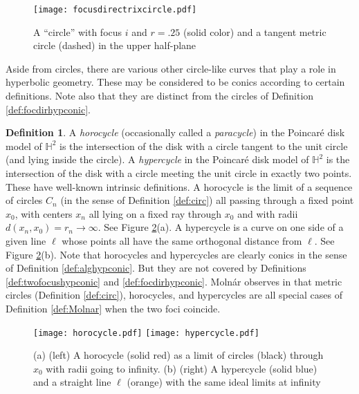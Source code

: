 \documentclass[12pt]{amsart}
\theoremstyle{definition}
\newtheorem{definition}[theorem]{Definition}
\begin{document}
\begin{figure}[hbt]
  \begin{center}
    \texttt{[image: focusdirectrixcircle.pdf]}
    \end{center}
\caption{A ``circle''  with focus $i$ and $r=.25$ (solid color) and a
  tangent metric circle (dashed) in the upper half-plane}
\label{fig:circ}
\end{figure}  

Aside from circles, there are various other circle-like curves that
play a role in hyperbolic geometry.  These may be considered to be
conics according to certain definitions. Note also that they are
distinct from the circles of Definition \ref{def:focdirhypconic}.
\begin{definition}
\label{def:cycle}
A \emph{horocycle} (occasionally called a \emph{paracycle})
in the Poincar\'e disk model of ${\mathbb H}^2$ is the
intersection of the disk with a circle tangent to the unit circle (and
lying inside the circle). A \emph{hypercycle} in the Poincar\'e disk
model of ${\mathbb H}^2$ is the intersection of the disk with a circle meeting
the unit circle in exactly two points.  These have well-known
intrinsic definitions. A horocycle is the limit of a sequence
of circles $C_n$ (in the sense of Definition \ref{def:circ}) all
passing through a fixed point $x_0$, with
centers $x_n$ all lying on a fixed ray through $x_0$
and with radii $d(x_n,x_0)=r_n\to \infty$.  See Figure \ref{fig:horo}(a).
A hypercycle is a curve on one side of a given line $\ell$
whose points all have the same orthogonal distance from $\ell$.
See Figure \ref{fig:horo}(b).
Note that horocycles and hypercycles are clearly conics
in the sense of Definition \ref{def:alghypconic}. But they are not
covered by Definitions \ref{def:twofocushypconic} and
\ref{def:focdirhypconic}. Moln\'ar observes in \cite{MR487028} that
metric circles (Definition \ref{def:circ}), horocycles, and
hypercycles are all special cases of 
Definition \ref{def:Molnar} when the two foci coincide.
\end{definition}
  \begin{figure}[hbt]
  \begin{center}
    \texttt{[image: horocycle.pdf]}\hspace{1in}
    \texttt{[image: hypercycle.pdf]}
    \end{center}
\caption{(a) (left) A horocycle (solid red) as a limit of circles (black)
  through $x_0$ with radii going to infinity. (b) (right) A hypercycle
  (solid blue) and a straight line $\ell$ (orange) 
  with the same ideal limits at infinity} 
\label{fig:horo}
\end{figure}
\end{document}
